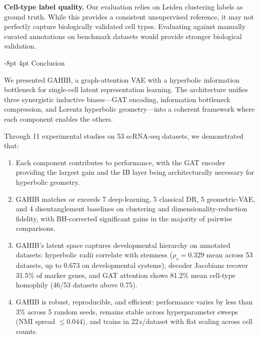 \documentclass[preprint,12pt]{elsarticle}
\makeatletter
\renewcommand\section{\@startsection{section}{1}{\z@}%
  {-8pt \@plus -2pt \@minus -2pt}%
  {4pt \@plus 1pt \@minus 1pt}%
  {\normalfont\Large\bfseries}}
\makeatother
\begin{document}
\textbf{Cell-type label quality.}
Our evaluation relies on Leiden clustering labels as ground truth.
While this provides a consistent unsupervised reference, it may not
perfectly capture biologically validated cell types.
Evaluating against manually curated annotations on benchmark datasets
would provide stronger biological validation.


\section{Conclusion}\label{sec:conclusion}

We presented GAHIB, a graph-attention VAE with a hyperbolic
information bottleneck for single-cell latent representation learning.
The architecture unifies three synergistic inductive biases---GAT
encoding, information bottleneck compression, and Lorentz hyperbolic
geometry---into a coherent framework where each component enables the
others.

Through 11 experimental studies on 53 scRNA-seq datasets, we
demonstrated that:
\begin{enumerate}[leftmargin=*,itemsep=2pt]
\item Each component contributes to performance, with the GAT encoder
  providing the largest gain and the IB layer being architecturally
  necessary for hyperbolic geometry.
\item GAHIB matches or exceeds 7 deep-learning, 5 classical DR, 5
  geometric-VAE, and 4 disentanglement baselines on clustering and
  dimensionality-reduction fidelity, with BH-corrected significant
  gains in the majority of pairwise comparisons.
\item GAHIB's latent space captures developmental hierarchy on
  annotated datasets: hyperbolic radii correlate with stemness
  ($\rho_s{=}0.329$ mean across 53 datasets, up to 0.673 on
  developmental systems), decoder Jacobians recover 31.5\% of marker
  genes, and GAT attention shows 81.2\% mean cell-type homophily
  (46/53 datasets above 0.75).
\item GAHIB is robust, reproducible, and efficient: performance varies
  by less than 3\% across 5 random seeds, remains stable across
  hyperparameter sweeps (NMI spread $\leq 0.044$), and trains in
  22\,s/dataset with flat scaling across cell counts.
\end{enumerate}
\end{document}
